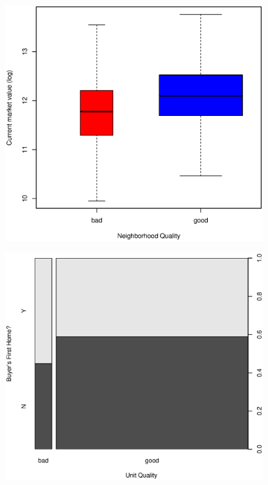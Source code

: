 \documentclass[11pt, fleqn]{article}
\begin{document}
\begin{figure}[!htb]
  \centering
  \includegraphics[scale=.5]{hown.eps}
  \caption{}
  \label{fig:hown}
\end{figure}

\begin{figure}[!htb]
  \centering
  \includegraphics[scale=.5]{first_home_vs_home_quality.eps}
  \caption{}
  \label{fig:first_qual}
\end{figure}
\end{document}
